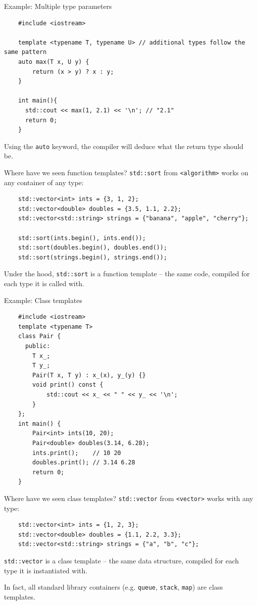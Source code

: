 \begin{frame}[fragile]{Example: Multiple type parameters}
  \begin{verbatim}
    #include <iostream>

    template <typename T, typename U> // additional types follow the same pattern
    auto max(T x, U y) {
        return (x > y) ? x : y;
    }

    int main(){
      std::cout << max(1, 2.1) << '\n'; // "2.1"
      return 0;
    }

  \end{verbatim}

  Using the \texttt{auto} keyword, the compiler will deduce what the return type should be.
\end{frame}

\begin{frame}[fragile]{Where have we seen function templates?}
  \texttt{std::sort} from \texttt{<algorithm>} works on any container of any type:
  \begin{verbatim}
    std::vector<int> ints = {3, 1, 2};
    std::vector<double> doubles = {3.5, 1.1, 2.2};
    std::vector<std::string> strings = {"banana", "apple", "cherry"};

    std::sort(ints.begin(), ints.end());
    std::sort(doubles.begin(), doubles.end());
    std::sort(strings.begin(), strings.end());
  \end{verbatim}
  Under the hood, \texttt{std::sort} is a function template -- the same code,
  compiled for each type it is called with.
\end{frame}

\begin{frame}[fragile]{Example: Class templates}
  \begin{verbatim}
    #include <iostream>
    template <typename T>
    class Pair {
      public:
        T x_;
        T y_;
        Pair(T x, T y) : x_(x), y_(y) {}
        void print() const {
            std::cout << x_ << " " << y_ << '\n';
        }
    };
    int main() {
        Pair<int> ints(10, 20);
        Pair<double> doubles(3.14, 6.28);
        ints.print();    // 10 20
        doubles.print(); // 3.14 6.28
        return 0;
    }
  \end{verbatim}
\end{frame}

\begin{frame}[fragile]{Where have we seen class templates?}
  \texttt{std::vector} from \texttt{<vector>} works with any type:
  \begin{verbatim}
    std::vector<int> ints = {1, 2, 3};
    std::vector<double> doubles = {1.1, 2.2, 3.3};
    std::vector<std::string> strings = {"a", "b", "c"};
  \end{verbatim}

  \texttt{std::vector} is a class template -- the same data structure,
  compiled for each type it is instantiated with. \vspace{4pt}

  In fact, all standard library containers (e.g. \texttt{queue}, \texttt{stack}, \texttt{map}) are class templates.
\end{frame}

